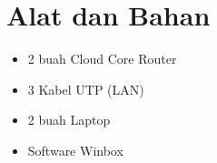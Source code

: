 \section*{Alat dan Bahan}
\indent

\begin{itemize}
    \item 2 buah Cloud Core Router
    \item 3 Kabel UTP (LAN)
    \item 2 buah Laptop
    \item Software Winbox
\end{itemize} 